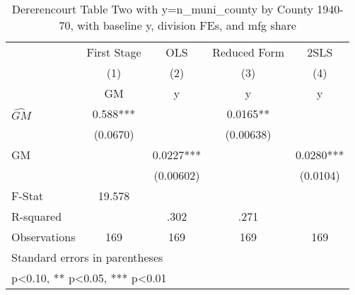 \begin{table}[htbp]\centering
\def\sym#1{\ifmmode^{#1}\else\(^{#1}\)\fi}
\caption{Dererencourt Table Two with y=n\_muni\_county by County 1940-70, with baseline y, division FEs, and mfg share}
\begin{tabular}{l*{4}{c}}
\toprule
                    & First Stage   &         OLS   &Reduced Form   &        2SLS   \\
                    &\multicolumn{1}{c}{(1)}&\multicolumn{1}{c}{(2)}&\multicolumn{1}{c}{(3)}&\multicolumn{1}{c}{(4)}\\
                    &\multicolumn{1}{c}{GM}&\multicolumn{1}{c}{y}&\multicolumn{1}{c}{y}&\multicolumn{1}{c}{y}\\
\midrule
$\hat{GM}$          &       0.588***&               &      0.0165** &               \\
                    &    (0.0670)   &               &   (0.00638)   &               \\
\addlinespace
GM                  &               &      0.0227***&               &      0.0280***\\
                    &               &   (0.00602)   &               &    (0.0104)   \\
\midrule
F-Stat              &      19.578   &               &               &               \\
R-squared           &               &        .302   &        .271   &               \\
Observations        &         169   &         169   &         169   &         169   \\
\bottomrule
\multicolumn{5}{l}{\footnotesize Standard errors in parentheses}\\
\multicolumn{5}{l}{\footnotesize * p<0.10, ** p<0.05, *** p<0.01}\\
\end{tabular}
\end{table}
